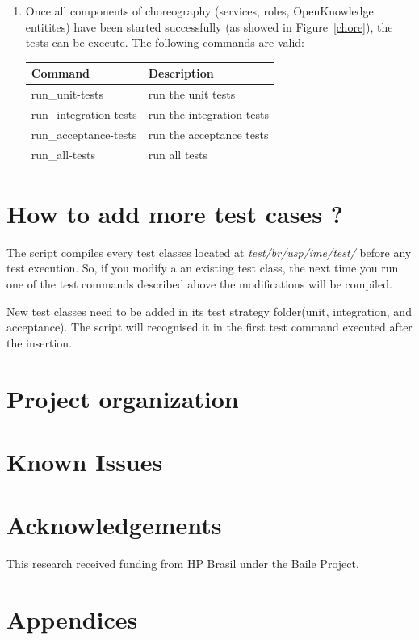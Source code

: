 \documentclass{article}	%
\begin{document}
\begin{enumerate}
  \item Once all components of choreography (services, roles, OpenKnowledge entitites) have been started successfully (as showed in Figure~\ref{chore}), the tests can be execute. The following commands are valid:

  \begin{table}[htb]
  \centering
  \begin{tabular}{|l|l|}
  \hline
  Command & Description \\
  \hline
  \hline
  run\_unit-tests & run the unit tests\\
  run\_integration-tests & run the integration tests \\
  run\_acceptance-tests & run the acceptance tests \\
  run\_all-tests & run all tests \\
  \hline
  \end{tabular}
  \end{table}

\end{enumerate}


\section{ How to add more test cases ? }
The script compiles every test classes located at \textit{test/br/usp/ime/test/} before any test execution. So, if you modify a an existing test class, the next time you run one of the test commands described above the modifications will be compiled. 

New test classes need to be added in its test strategy folder(unit, integration, and acceptance). The script will recognised it in the first test command executed after the insertion.

\section { Project organization }

\section{ Known Issues }

\section{Acknowledgements}
This research received funding from HP Brasil under the Baile Project.

\section{Appendices}


\newpage

\end{document}
